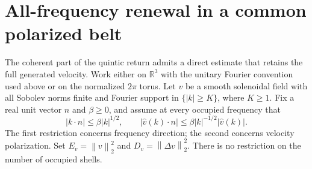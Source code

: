 \documentclass[11pt]{article}
\newcommand{\R}{\mathbb R}
\newcommand{\norm}[1]{\left\lVert#1\right\rVert}
\begin{document}
\section{All-frequency renewal in a common polarized belt}

The coherent part of the quintic return admits a direct estimate that
retains the full generated velocity. Work either on $\R^3$ with the
unitary Fourier convention used above or on the normalized $2\pi$ torus.
Let $v$ be a smooth solenoidal field with all Sobolev norms finite and
Fourier support in $\{|k|\geq K\}$,
where $K\geq1$. Fix a real unit vector $n$ and $\beta\geq0$, and assume
at every occupied frequency that
\begin{equation}\label{eq:beltgeometry}
 |k\cdot n|\leq\beta |k|^{1/2},\qquad
 |\widehat v(k)\cdot n|
       \leq\beta |k|^{-1/2}|\widehat v(k)|.
\end{equation}
The first restriction concerns frequency direction; the second concerns
velocity polarization. Set $E_v=\norm v_2^2$ and $D_v=\norm{\Delta v}_2^2$.
There is no restriction on the number of occupied shells.
\end{document}
